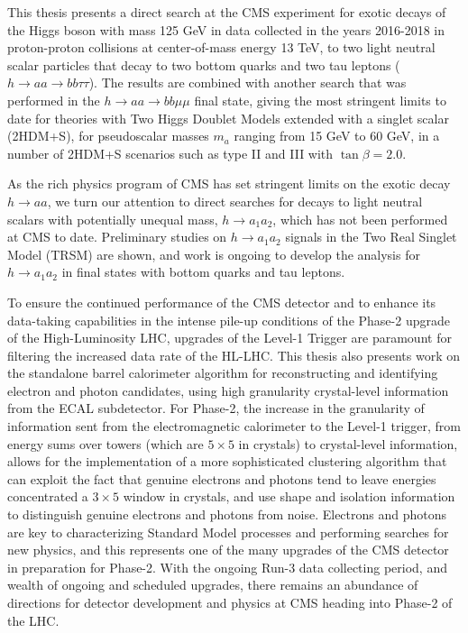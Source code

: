 This thesis presents a direct search at the CMS experiment for exotic decays of the Higgs boson with mass 125 GeV in data collected in the years 2016-2018 in proton-proton collisions at center-of-mass energy 13 TeV, to two light neutral scalar particles that decay to two bottom quarks and two tau leptons ($h \rightarrow aa \rightarrow bb\tau\tau$). The results are combined with another search that was performed in the $h \rightarrow aa \rightarrow bb\mu\mu$ final state, giving the most stringent limits to date for theories with Two Higgs Doublet Models extended with a singlet scalar (2HDM+S), for pseudoscalar masses $m_a$ ranging from 15 GeV to 60 GeV, in a number of 2HDM+S scenarios such as type II and III with $\tan\beta = 2.0$.

As the rich physics program of CMS has set stringent limits on the exotic decay $h \rightarrow aa$, we turn our attention to direct searches for decays to light neutral scalars with potentially unequal mass, $h \rightarrow a_1 a_2$, which has not been performed at CMS to date. Preliminary studies on $h \rightarrow a_1 a_2$ signals in the Two Real Singlet Model (TRSM) are shown, and work is ongoing to develop the analysis for $h \rightarrow a_1 a_2$ in final states with bottom quarks and tau leptons.

To ensure the continued performance of the CMS detector and to enhance its data-taking capabilities in the intense pile-up conditions of the Phase-2 upgrade of the High-Luminosity LHC, upgrades of the Level-1 Trigger are paramount for filtering the increased data rate of the HL-LHC. This thesis also presents work on the standalone barrel calorimeter algorithm for reconstructing and identifying electron and photon candidates, using high granularity crystal-level information from the ECAL subdetector. For Phase-2, the increase in the granularity of information sent from the electromagnetic calorimeter to the Level-1 trigger, from energy sums over towers (which are $5\times 5$ in crystals) to crystal-level information, allows for the implementation of a more sophisticated clustering algorithm that can exploit the fact that genuine electrons and photons tend to leave energies concentrated a $3 \times 5$ window in crystals, and use shape and isolation information to distinguish genuine electrons and photons from noise. Electrons and photons are key to characterizing Standard Model processes and performing searches for new physics, and this represents one of the many upgrades of the CMS detector in preparation for Phase-2. With the ongoing Run-3 data collecting period, and wealth of ongoing and scheduled upgrades, there remains an abundance of directions for detector development and physics at CMS heading into Phase-2 of the LHC.